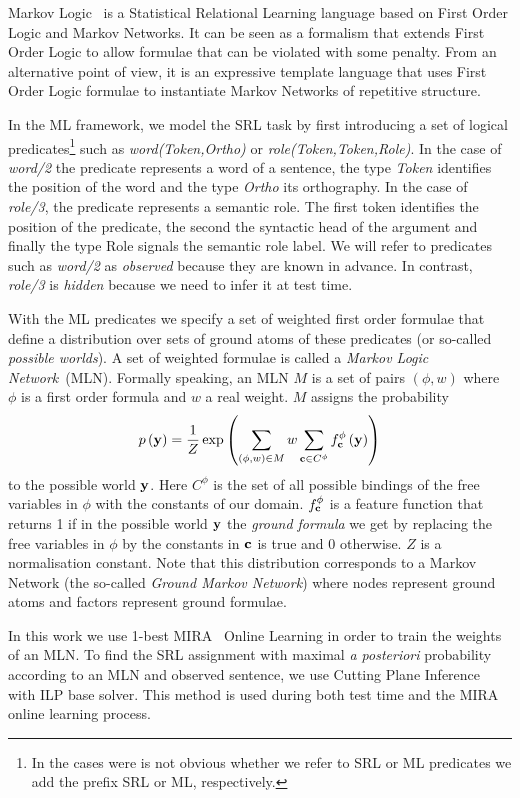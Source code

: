 Markov Logic~\citep[ML,][]{richardson06mln} is a Statistical Relational Learning 
language based on First Order Logic and Markov Networks. It can be seen as a 
formalism that extends First Order Logic to allow formulae that can be violated 
with some penalty. From an alternative point of view, it is an expressive 
template language that uses First Order Logic formulae to instantiate
Markov Networks of repetitive structure. 

In the ML framework,  we model the SRL task by first introducing a set of 
logical predicates\footnote{In the cases were is not obvious whether we refer 
to SRL or ML predicates we add the prefix SRL or ML, respectively.} such as 
\emph{word(Token,Ortho)} or \emph{role(Token,Token,Role)}. In the case of 
\emph{word/2} the predicate represents a word of a sentence, the type 
\emph{Token} identifies the position of the word and the type \emph{Ortho} its 
orthography. In the case of \emph{role/3}, the predicate represents a semantic 
role. The first token identifies the position of the predicate, the second the 
syntactic head of the argument and finally the type Role signals the semantic 
role label. We will refer to predicates such as \emph{word/2} as \emph{observed} 
because they are known in advance. In contrast, \emph{role/3} is \emph{hidden} 
because we need to infer it at test time.

With the ML predicates we specify a set of weighted first order formulae that 
define a distribution over sets of ground atoms of these predicates (or 
so-called \emph{possible worlds}). A set of weighted formulae is called a 
\emph{Markov Logic Network}~(MLN). Formally speaking, an MLN $M$ is a set of 
pairs $\left(\phi,w\right)$ where $\phi$ is a first order formula and $w$ a real 
weight. $M$ assigns the probability
\begin{equation}
p\left(\mathbf{y}\right)=\frac{1}{Z}\exp\left(
\sum_{\left(\phi,w\right)\in M} w
\sum_{\mathbf{c}\in C^{\phi}}f_{\mathbf{c}}^{\phi}\left(\mathbf{y}\right)
\right)
\label{eq:prob}
\end{equation}
to the possible world $\mathbf{y}$.  Here $C^{\phi}$ is the set of all possible
bindings of the free variables in $\phi$ with the constants of our
domain. $f_{\mathbf{c}}^{\phi}$ is a feature function that returns 1
if in the possible world $\mathbf{y}$ the \emph{ground formula} we get by
replacing the free variables in $\phi$ by the constants in $\mathbf{c}$
is true and 0 otherwise. $Z$ is a normalisation constant. Note that
this distribution corresponds to a Markov Network (the so-called \emph{Ground
Markov Network}) where nodes represent ground atoms and factors represent
ground formulae.

In this work we use 1-best 
MIRA~\citep{crammer01ultraconservative} Online Learning in order to train the weights of an MLN.  To find the SRL assignment with maximal \emph{a posteriori} probability according to an MLN and observed sentence, we use Cutting Plane 
Inference~\citep[CPI,][]{riedel08improving} with ILP base solver. This method is 
used during both test time and the MIRA online learning process.


